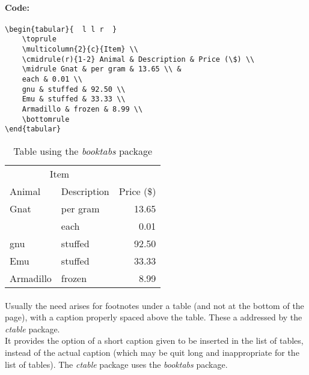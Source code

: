 \documentclass[11pt,a4paper]{article}
\begin{document}
\paragraph{Code:}
\begin{verbatim}
\begin{tabular}{  l l r  }
	\toprule
	\multicolumn{2}{c}{Item} \\
	\cmidrule(r){1-2} Animal & Description & Price (\$) \\
	\midrule Gnat & per gram & 13.65 \\ &
	each & 0.01 \\
	gnu & stuffed & 92.50 \\
	Emu & stuffed & 33.33 \\
	Armadillo & frozen & 8.99 \\
	\bottomrule
\end{tabular}
\end{verbatim}

\begin{table}[htbp]
	\centering
	\begin{tabular}{  l l r  }
	\toprule
	\multicolumn{2}{c}{Item} \\
	\cmidrule(r){1-2} Animal & Description & Price (\$) \\
	\midrule Gnat & per gram & 13.65 \\ &
	each & 0.01 \\
	gnu & stuffed & 92.50 \\
	Emu & stuffed & 33.33 \\
	Armadillo & frozen & 8.99 \\
	\bottomrule
	\end{tabular}
	\caption{Table using the \emph{booktabs} package}
	\label{tablebooktabs}
\end{table}

\paragraph{}
Usually the need arises for footnotes under a table (and not at the bottom of the page),
with a caption properly spaced above the table. These a addressed by the \emph{ctable} package. \\
It provides the option of a short caption given to be inserted in the list of tables,
instead of the actual caption (which may be quit long and inappropriate for the list of tables).
The \emph{ctable} package uses the \emph{booktabs} package.
\end{document}
